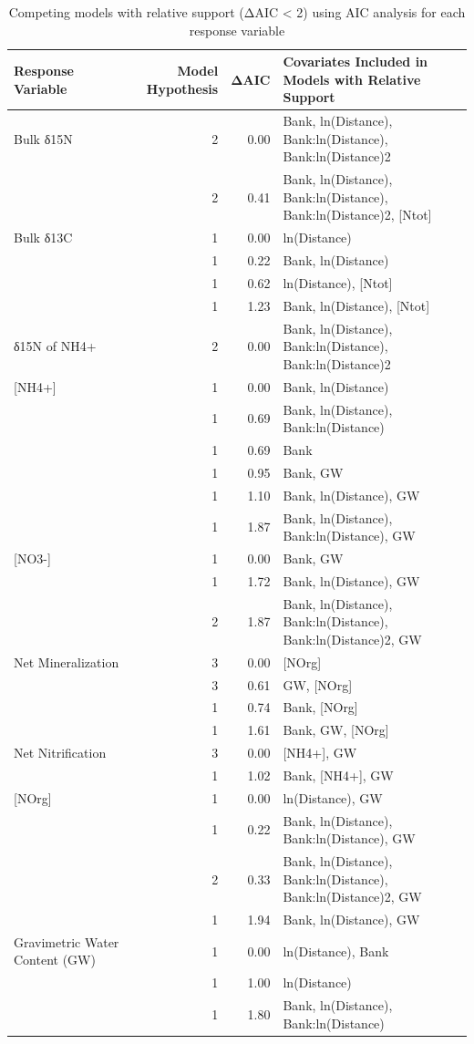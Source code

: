 \documentclass [11pt, proquest] {uwthesis}[2015/03/03]
\begin{document}
\begingroup\fontsize{8}{10}\selectfont
\begin{longtable}[t]{lrrl}
\caption{\label{tab:suppmod1}Competing models with relative support (ΔAIC < 2) using AIC analysis for each response variable}\\
\toprule
Response Variable & Model Hypothesis & ΔAIC & Covariates Included in Models with Relative Support\\
\midrule
Bulk δ15N & 2 & 0.00 & Bank, ln(Distance), Bank:ln(Distance), Bank:ln(Distance)2\\
 & 2 & 0.41 & Bank, ln(Distance), Bank:ln(Distance), Bank:ln(Distance)2, [Ntot]\\
Bulk δ13C & 1 & 0.00 & ln(Distance)\\
 & 1 & 0.22 & Bank, ln(Distance)\\
 & 1 & 0.62 & ln(Distance), [Ntot]\\
\addlinespace
 & 1 & 1.23 & Bank, ln(Distance), [Ntot]\\
δ15N of NH4+ & 2 & 0.00 & Bank, ln(Distance), Bank:ln(Distance), Bank:ln(Distance)2\\
{}[NH4+] & 1 & 0.00 & Bank, ln(Distance)\\
 & 1 & 0.69 & Bank, ln(Distance), Bank:ln(Distance)\\
 & 1 & 0.69 & Bank\\
\addlinespace
 & 1 & 0.95 & Bank, GW\\
 & 1 & 1.10 & Bank, ln(Distance), GW\\
 & 1 & 1.87 & Bank, ln(Distance), Bank:ln(Distance), GW\\
{}[NO3-] & 1 & 0.00 & Bank, GW\\
 & 1 & 1.72 & Bank, ln(Distance), GW\\
\addlinespace
 & 2 & 1.87 & Bank, ln(Distance), Bank:ln(Distance), Bank:ln(Distance)2, GW\\
Net Mineralization & 3 & 0.00 & {}[NOrg]\\
 & 3 & 0.61 & GW, [NOrg]\\
 & 1 & 0.74 & Bank, [NOrg]\\
 & 1 & 1.61 & Bank, GW, [NOrg]\\
\addlinespace
Net Nitrification & 3 & 0.00 & {}[NH4+], GW\\
 & 1 & 1.02 & Bank, [NH4+], GW\\
{}[NOrg] & 1 & 0.00 & ln(Distance), GW\\
 & 1 & 0.22 & Bank, ln(Distance), Bank:ln(Distance), GW\\
 & 2 & 0.33 & Bank, ln(Distance), Bank:ln(Distance), Bank:ln(Distance)2, GW\\
\addlinespace
 & 1 & 1.94 & Bank, ln(Distance), GW\\
Gravimetric Water Content (GW) & 1 & 0.00 & ln(Distance), Bank\\
 & 1 & 1.00 & ln(Distance)\\
 & 1 & 1.80 & Bank, ln(Distance), Bank:ln(Distance)\\
\bottomrule
\end{longtable}
\end{document}
